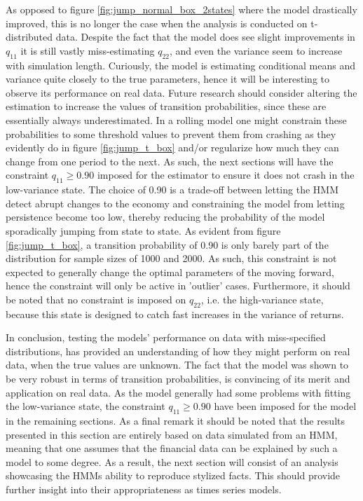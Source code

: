 As opposed to figure \ref{fig:jump_normal_box_2states} where the \mle model drastically improved, this is no longer the case when the analysis is conducted on t-distributed data. Despite the fact that the \mle model does see slight improvements in $q_{11}$ it is still vastly miss-estimating $q_{22}$, and even the variance seem to increase with simulation length. Curiously, the \mle model is estimating conditional means and variance quite closely to the true parameters, hence it will be interesting to observe its performance on real data. Future research should consider altering the \mle estimation to increase the values of transition probabilities, since these are essentially always underestimated. In a rolling model one might constrain these probabilities to some threshold values to prevent them from crashing as they evidently do in figure \ref{fig:jump_t_box} and/or regularize how much they can change from one period to the next. As such, the next sections will have the constraint $q_{11} \geq 0.90$ imposed for the \mle estimator to ensure it does not crash in the low-variance state. The choice of 0.90 is a trade-off between letting the HMM detect abrupt changes to the economy and constraining the model from letting persistence become too low, thereby reducing the probability of the \mle model sporadically jumping from state to state. As evident from figure \ref{fig:jump_t_box}, a transition probability of 0.90 is only barely part of the distribution for sample sizes of 1000 and 2000. As such, this constraint is not expected to generally change the optimal parameters of the \mle moving forward, hence the constraint will only be active in 'outlier' cases. Furthermore, it should be noted that no constraint is imposed on $q_{22}$, i.e. the high-variance state, because this state is designed to catch fast increases in the variance of returns.

In conclusion, testing the models' performance on data with miss-specified distributions, has provided an understanding of how they might perform on real data, when the true values are unknown. The fact that the \jump model was shown to be very robust in terms of transition probabilities, is convincing of its merit and application on real data. As the \mle model generally had some problems with fitting the low-variance state, the constraint $q_{11}\geq 0.90$ have been imposed for the model in the remaining sections. As a final remark it should be noted that the results presented in this section are entirely based on data simulated from an HMM, meaning that one assumes that the financial data can be explained by such a model to some degree. As a result, the next section will consist of an analysis showcasing the HMMs ability to reproduce stylized facts. This should provide further insight into their appropriateness as times series models.